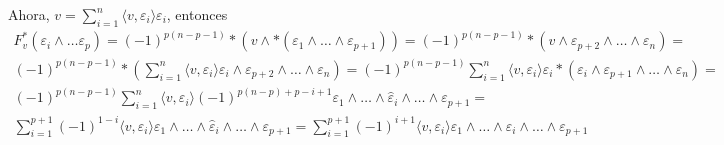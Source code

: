 \documentclass[twoside]{article}
\begin{document}
\begin{solucion}
Ahora, $v=\sum_{i=1}^n\langle v,\varepsilon_i\rangle\varepsilon_i$, entonces
\begin{gather*}
F^*_v(\varepsilon_i\land\dots\varepsilon_p)=(-1)^{p(n-p-1)}*(v\land *(\varepsilon_1\land\dots\land\varepsilon_{p+1}))=(-1)^{p(n-p-1)}*(v\land\varepsilon_{p+2}\land\dots\land\varepsilon_n)=\\
(-1)^{p(n-p-1)}*\left(\sum_{i=1}^n\langle v,\varepsilon_i\rangle\varepsilon_i\land\varepsilon_{p+2}\land\dots\land\varepsilon_n \right)=
(-1)^{p(n-p-1)}\sum_{i=1}^n\langle v,\varepsilon_i\rangle\varepsilon_i *(\varepsilon_i\land\varepsilon_{p+1}\land\dots\land\varepsilon_n)=\\
(-1)^{p(n-p-1)}\sum_{i=1}^n\langle v,\varepsilon_i\rangle(-1)^{p(n-p)+p-i+1}\varepsilon_1\land\dots\land\hat{\varepsilon}_i\land\dots\land\varepsilon_{p+1}=\\
\sum_{i=1}^{p+1}(-1)^{1-i}\langle v,\varepsilon_i\rangle\varepsilon_1\land\dots\land\hat{\varepsilon}_i\land\dots\land\varepsilon_{p+1}=
\sum_{i=1}^{p+1}(-1)^{i+1}\langle v,\varepsilon_i\rangle\varepsilon_1\land\dots\land\hat{\varepsilon}_i\land\dots\land\varepsilon_{p+1}
\end{gather*}


\end{solucion}
\end{document}
